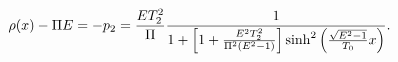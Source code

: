 \begin{equation}
\rho(x)-\Pi E =-p_{2} = \frac{ET_{2}^{2}}{\Pi}
\frac{1}{1+\left[1+\frac{E^{2}T_{2}^{2}}{\Pi^{2}(E^{2}-1)}\right]
{\rm sinh}^{2}\left(\frac{\sqrt{E^{2}-1}}{T_{0}}x\right)}.
\end{equation}

